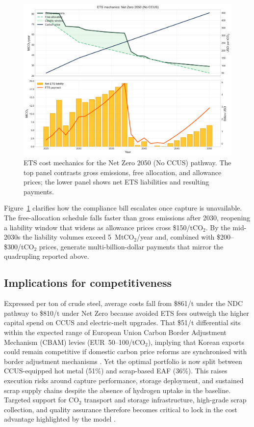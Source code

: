 \documentclass[preprint,1p,authoryear]{elsarticle}
\begin{document}
\begin{figure}[!t]
  \centering
  \includegraphics[width=0.85\linewidth]{ets_cost_logic}
  \caption{ETS cost mechanics for the Net Zero 2050 (No CCUS) pathway. The top panel contrasts gross emissions, free allocation, and allowance prices; the lower panel shows net ETS liabilities and resulting payments.}
  \label{fig:ets-logic}
\end{figure}

Figure~\ref{fig:ets-logic} clarifies how the compliance bill escalates once capture is unavailable. The free-allocation schedule falls faster than gross emissions after 2030, reopening a liability window that widens as allowance prices cross \$150/tCO$_2$. By the mid-2030s the liability volumes exceed 5~MtCO$_2$/year and, combined with \$200--\$300/tCO$_2$ prices, generate multi-billion-dollar payments that mirror the quadrupling reported above.

\subsection{Implications for competitiveness}

Expressed per ton of crude steel, average costs fall from \$861/t under the NDC pathway to \$810/t under Net Zero because avoided ETS fees outweigh the higher capital spend on CCUS and electric-melt upgrades. That \$51/t differential sits within the expected range of European Union Carbon Border Adjustment Mechanism (CBAM) levies (EUR~50--100/tCO$_2$), implying that Korean exports could remain competitive if domestic carbon price reforms are synchronised with border adjustment mechanisms \citep{Vogl2018}. Yet the optimal portfolio is now split between CCUS-equipped hot metal (51\%) and scrap-based EAF (36\%). This raises execution risks around capture performance, storage deployment, and sustained scrap supply chains despite the absence of hydrogen uptake in the baseline. Targeted support for CO$_2$ transport and storage infrastructure, high-grade scrap collection, and quality assurance therefore becomes critical to lock in the cost advantage highlighted by the model \citep{Griffin2020}.
\end{document}
